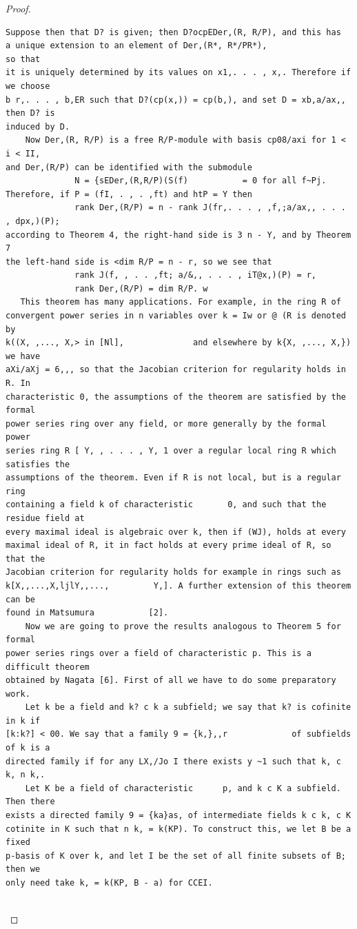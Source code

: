 \begin{proof}
\begin{verbatim}
Suppose then that D? is given; then D?ocpEDer,(R, R/P), and this has
a unique extension to an element of Der,(R*, R*/PR*),                             so that
it is uniquely determined by its values on x1,. . . , x,. Therefore if we choose
b r,. . . , b,ER such that D?(cp(x,)) = cp(b,), and set D = xb,a/ax,, then D? is
induced by D.
    Now Der,(R, R/P) is a free R/P-module with basis cp08/axi for 1 < i < II,
and Der,(R/P) can be identified with the submodule
              N = {sEDer,(R,R/P)(S(f)           = 0 for all f~Pj.
Therefore, if P = (fI, . , . ,ft) and htP = Y then
              rank Der,(R/P) = n - rank J(fr,. . . , ,f,;a/ax,, . . . , dpx,)(P);
according to Theorem 4, the right-hand side is 3 n - Y, and by Theorem 7
the left-hand side is <dim R/P = n - r, so we see that
              rank J(f, , . . ,ft; a/&,, . . . , iT@x,)(P) = r,
              rank Der,(R/P) = dim R/P. w
   This theorem has many applications. For example, in the ring R of
convergent power series in n variables over k = Iw or @ (R is denoted by
k((X, ,..., X,> in [Nl],              and elsewhere by k{X, ,..., X,}) we have
aXi/aXj = 6,,, so that the Jacobian criterion for regularity holds in R. In
characteristic 0, the assumptions of the theorem are satisfied by the formal
power series ring over any field, or more generally by the formal power
series ring R [ Y, , . . . , Y, 1 over a regular local ring R which satisfies the
assumptions of the theorem. Even if R is not local, but is a regular ring
containing a field k of characteristic       0, and such that the residue field at
every maximal ideal is algebraic over k, then if (WJ), holds at every
maximal ideal of R, it in fact holds at every prime ideal of R, so that the
Jacobian criterion for regularity holds for example in rings such as
k[X,,...,X,ljlY,,...,         Y,]. A further extension of this theorem can be
found in Matsumura           [2].
    Now we are going to prove the results analogous to Theorem 5 for formal
power series rings over a field of characteristic p. This is a difficult theorem
obtained by Nagata [6]. First of all we have to do some preparatory work.
    Let k be a field and k? c k a subfield; we say that k? is cofinite in k if
[k:k?] < 00. We say that a family 9 = {k,},,r             of subfields of k is a
directed family if for any LX,/Jo I there exists y ~1 such that k, c k, n k,.
    Let K be a field of characteristic      p, and k c K a subfield. Then there
exists a directed family 9 = {ka}as, of intermediate fields k c k, c K
cotinite in K such that n k, = k(KP). To construct this, we let B be a fixed
p-basis of K over k, and let I be the set of all finite subsets of B; then we
only need take k, = k(KP, B - a) for CCEI.


\end{verbatim}
\end{proof}
